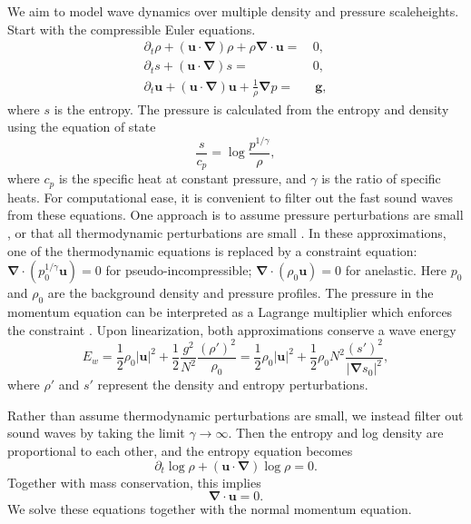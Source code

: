 \documentclass[
        fleqn,
        usenatbib,
    ]{mnras}
\newcommand*{\abs}[1]{\left|#1\right|}
\newcommand*{\p}[1]{\left(#1\right)}
\newcommand*{\bm}[1]{\mathbf{#1}}
\begin{document}
We aim to model wave dynamics over multiple density and pressure scaleheights.
Start with the compressible Euler equations.
\begin{align}
    \partial_t \rho + \p{\bm{u}\cdot\bm{\nabla}} \rho
            + \rho \bm{\nabla}\cdot\bm{u} =\, &0, \\
    \partial_t s + \p{\bm{u}\cdot\bm{\nabla}} s =\, &0, \\
    \partial_t \bm{u} + \p{\bm{u}\cdot\bm{\nabla}}\bm{u} +
        \frac{1}{\rho}\bm{\nabla} p =& \, \bm{g},
\end{align}
where $s$ is the entropy. The pressure is calculated from the entropy and
density using the equation of state
\begin{equation}
    \frac{s}{c_p} = \log \frac{p^{1/\gamma}}{\rho},
\end{equation}
where $c_p$ is the specific heat at constant pressure, and $\gamma$ is the ratio
of specific heats. For computational ease, it is convenient to filter out the
fast sound waves from these equations. One approach is to assume pressure
perturbations are small \citep[yielding the ``pseudo-incompressible''
equations,][]{anel_part2}, or that all thermodynamic perturbations are small
\citep[yielding the ``anelastic'' equations,][]{anel_part1}. In these
approximations, one of the thermodynamic equations is replaced by a constraint
equation: $\bm{\nabla}\cdot \p{p_0^{1/\gamma} \bm{u}}=0$ for
pseudo-incompressible; $\bm{\nabla}\cdot\p{\rho_0 \bm{u}} =0$ for anelastic.
Here $p_0$ and $\rho_0$ are the background density and pressure profiles. The
pressure in the momentum equation can be interpreted as a Lagrange multiplier
which enforces the constraint \citep{anel_part2}. Upon linearization, both
approximations conserve a wave energy
\begin{equation}
    E_w = \frac{1}{2}\rho_0 \abs{\bm{u}}^2
            + \frac{1}{2}\frac{g^2}{N^2} \frac{(\rho')^2}{\rho_0}
        = \frac{1}{2}\rho_0 \abs{\bm{u}}^2
            + \frac{1}{2}\rho_0 N^2 \frac{(s')^2}{\abs{\bm{\nabla} s_0}^2},
            \label{eq:ewave}
\end{equation}
where $\rho'$ and $s'$ represent the density and entropy perturbations.

Rather than assume thermodynamic perturbations are small, we instead filter out
sound waves by taking the limit $\gamma\rightarrow \infty$. Then the entropy and
log density are proportional to each other, and the entropy equation becomes
\begin{equation}
    \partial_t \log \rho + \p{\bm{u}\cdot \bm{\nabla}} \log \rho = 0.
\end{equation}
Together with mass conservation, this implies
\begin{equation}
    \bm{\nabla} \cdot \bm{u} = 0.
\end{equation}
We solve these equations together with the normal momentum equation.
\end{document}

